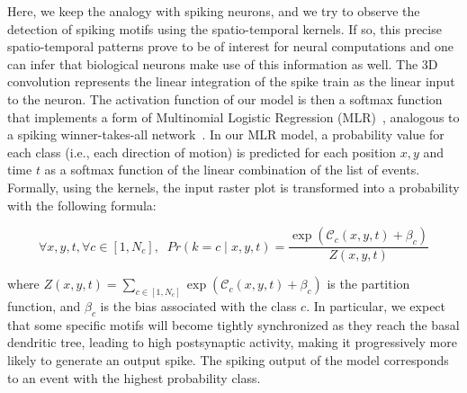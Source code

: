 \documentclass[default]{sn-jnl}%
\theoremstyle{thmstyleone}%
\theoremstyle{thmstyletwo}%
\theoremstyle{thmstylethree}%
\newcommand{\bias}{\beta} %
\newcommand{\timev}{t} %
\newcommand{\class}{c} %
\begin{document}
Here, we keep the analogy with spiking neurons, and we try to observe the detection of spiking motifs using the spatio-temporal kernels. If so, this precise spatio-temporal patterns prove to be of interest for neural computations and one can infer that biological neurons make use of this information as well. The 3D convolution represents the linear integration of the spike train as the linear input to the neuron. The activation function of our model is then a softmax function that implements a form of Multinomial Logistic Regression (MLR)~\citep{grimaldi_robust_2022}, analogous to a spiking winner-takes-all network~\citep{nessler_bayesian_2013}. In our MLR model, a probability value for each class (i.e., each direction of motion) is predicted for each position $x, y$ and time $\timev$ as a softmax function of the linear combination of the list of events. Formally, using the kernels, the input raster plot is transformed into a probability with the following formula:
%
\begin{linenomath*}
\begin{equation}\label{eq:mlr}
    \forall x, y, \timev, \forall \class \in [1, N_\class], \; \;
Pr(k=\class \; \vert \;  x, y, \timev) =
\frac {\exp  (\mathcal{C}_\class(x, y, \timev) +\bias_\class) }{Z(x, y, \timev)}
\end{equation} 
\end{linenomath*}
%
where $Z(x, y, \timev)=\sum_{\class \in [1, N_\class]} \exp (\mathcal{C}_\class(x, y, \timev) +\bias_\class)$ is the partition function, and $\bias_\class$ is the bias associated with the class $\class$. 
In particular, we expect that some specific motifs will become tightly synchronized as they reach the basal dendritic tree, leading to high postsynaptic activity, making it progressively more likely to generate an output spike. The spiking output of the model corresponds to an event with the highest probability class.
\end{document}

